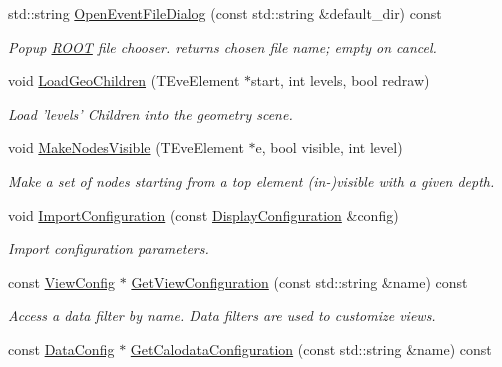 \begin{DoxyCompactItemize}
std::string \hyperlink{class_d_d4hep_1_1_display_a6d465f217d173aef4046212a724bfc3b}{OpenEventFileDialog} (const std::string \&default\_\-dir) const 
\begin{DoxyCompactList}\small\item\em Popup \hyperlink{namespace_r_o_o_t}{ROOT} file chooser. returns chosen file name; empty on cancel. \item\end{DoxyCompactList}\item 
void \hyperlink{class_d_d4hep_1_1_display_a4432cbc091804b89436dd88dff8484f9}{LoadGeoChildren} (TEveElement $\ast$start, int levels, bool redraw)
\begin{DoxyCompactList}\small\item\em Load 'levels' Children into the geometry scene. \item\end{DoxyCompactList}\item 
void \hyperlink{class_d_d4hep_1_1_display_a7d6adb53b1895ebb1133b4e5bbb1d6d4}{MakeNodesVisible} (TEveElement $\ast$e, bool visible, int level)
\begin{DoxyCompactList}\small\item\em Make a set of nodes starting from a top element (in-\/)visible with a given depth. \item\end{DoxyCompactList}\item 
void \hyperlink{class_d_d4hep_1_1_display_a3dfe74c5f4b7f1547ccf07ccba8b6d39}{ImportConfiguration} (const \hyperlink{class_d_d4hep_1_1_display_configuration}{DisplayConfiguration} \&config)
\begin{DoxyCompactList}\small\item\em Import configuration parameters. \item\end{DoxyCompactList}\item 
const \hyperlink{class_d_d4hep_1_1_display_configuration_1_1_view_config}{ViewConfig} $\ast$ \hyperlink{class_d_d4hep_1_1_display_a7e9a8e14da11c617536de4bf4a50ca71}{GetViewConfiguration} (const std::string \&name) const 
\begin{DoxyCompactList}\small\item\em Access a data filter by name. Data filters are used to customize views. \item\end{DoxyCompactList}\item 
const \hyperlink{class_d_d4hep_1_1_display_configuration_1_1_config}{DataConfig} $\ast$ \hyperlink{class_d_d4hep_1_1_display_a1384c53062dc59757759064aa6898956}{GetCalodataConfiguration} (const std::string \&name) const 

\end{DoxyCompactItemize}
